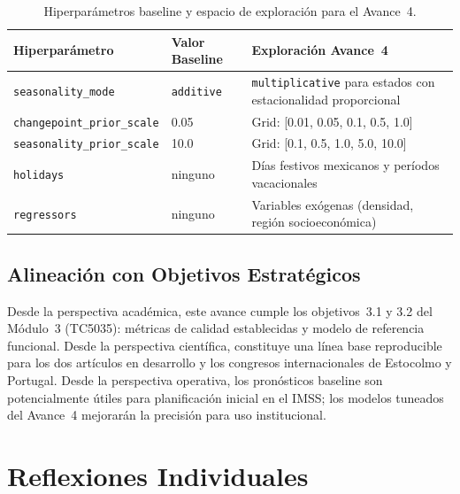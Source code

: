 \documentclass[11pt,a4paper]{article}
\begin{document}
\begin{table}[H]
\centering
\caption{Hiperparámetros baseline y espacio de exploración para el Avance~4.}
\label{tab:tuning}
\small
\begin{tabularx}{\textwidth}{@{}l l X@{}}
\toprule
\textbf{Hiperparámetro} & \textbf{Valor Baseline} & \textbf{Exploración Avance~4} \\
\midrule
\texttt{seasonality\_mode} & \texttt{additive} & \texttt{multiplicative} para estados con estacionalidad proporcional \\
\texttt{changepoint\_prior\_scale} & 0.05 & Grid: [0.01, 0.05, 0.1, 0.5, 1.0] \\
\texttt{seasonality\_prior\_scale} & 10.0 & Grid: [0.1, 0.5, 1.0, 5.0, 10.0] \\
\texttt{holidays} & ninguno & Días festivos mexicanos y períodos vacacionales \\
\texttt{regressors} & ninguno & Variables exógenas (densidad, región socioeconómica) \\
\bottomrule
\end{tabularx}
\end{table}

\subsection{Alineación con Objetivos Estratégicos}

Desde la perspectiva académica, este avance cumple los objetivos~3.1 y 3.2 del Módulo~3 (TC5035): métricas de calidad establecidas y modelo de referencia funcional. Desde la perspectiva científica, constituye una línea base reproducible para los dos artículos en desarrollo y los congresos internacionales de Estocolmo y Portugal. Desde la perspectiva operativa, los pronósticos baseline son potencialmente útiles para planificación inicial en el IMSS; los modelos tuneados del Avance~4 mejorarán la precisión para uso institucional.

\section{Reflexiones Individuales}\label{sec:reflexiones}
\end{document}
